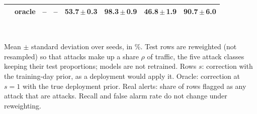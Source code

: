\begin{table}[t]
\begin{tabular}{llrrrrrr}
 & oracle & -- & -- & 53.7{\,}$\pm${\,}0.3 & 98.3{\,}$\pm${\,}0.9 & 46.8{\,}$\pm${\,}1.9 & 90.7{\,}$\pm${\,}6.0 \\
\bottomrule
\end{tabular}
\\[2pt]
\parbox{\linewidth}{\scriptsize Mean $\pm$ standard deviation over  seeds, in \%. Test rows are reweighted (not resampled) so that attacks make up a share $\rho$ of traffic, the five attack classes keeping their test proportions; models are not retrained. Rows $s$: correction with the training-day prior, as a deployment would apply it. Oracle: correction at $s=1$ with the true deployment prior. Real alerts: share of rows flagged as any attack that are attacks. Recall and false alarm rate do not change under reweighting.}
\end{table}
